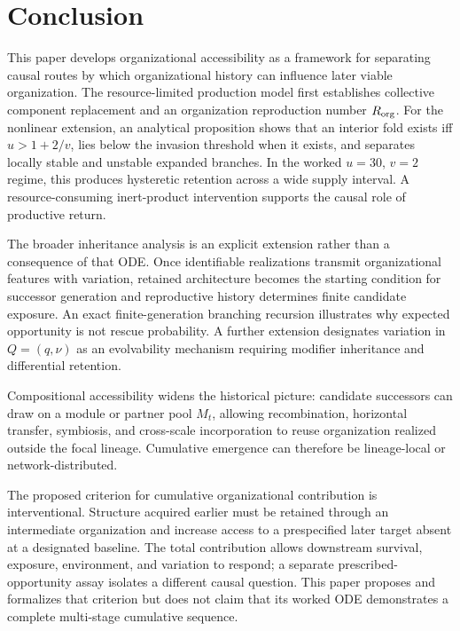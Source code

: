 \documentclass[11pt,a4paper]{article}
\begin{document}
\section{Conclusion}

This paper develops organizational accessibility as a framework for separating causal routes by which organizational history can influence later viable organization. The resource-limited production model first establishes collective component replacement and an organization reproduction number $R_{\rm org}$. For the nonlinear extension, an analytical proposition shows that an interior fold exists iff $u>1+2/v$, lies below the invasion threshold when it exists, and separates locally stable and unstable expanded branches. In the worked $u=30$, $v=2$ regime, this produces hysteretic retention across a wide supply interval. A resource-consuming inert-product intervention supports the causal role of productive return.

The broader inheritance analysis is an explicit extension rather than a consequence of that ODE. Once identifiable realizations transmit organizational features with variation, retained architecture becomes the starting condition for successor generation and reproductive history determines finite candidate exposure. An exact finite-generation branching recursion illustrates why expected opportunity is not rescue probability. A further extension designates variation in $Q=(q,\nu)$ as an evolvability mechanism requiring modifier inheritance and differential retention.

Compositional accessibility widens the historical picture: candidate successors can draw on a module or partner pool $M_t$, allowing recombination, horizontal transfer, symbiosis, and cross-scale incorporation to reuse organization realized outside the focal lineage. Cumulative emergence can therefore be lineage-local or network-distributed.

The proposed criterion for cumulative organizational contribution is interventional. Structure acquired earlier must be retained through an intermediate organization and increase access to a prespecified later target absent at a designated baseline. The total contribution allows downstream survival, exposure, environment, and variation to respond; a separate prescribed-opportunity assay isolates a different causal question. This paper proposes and formalizes that criterion but does not claim that its worked ODE demonstrates a complete multi-stage cumulative sequence.
\end{document}
